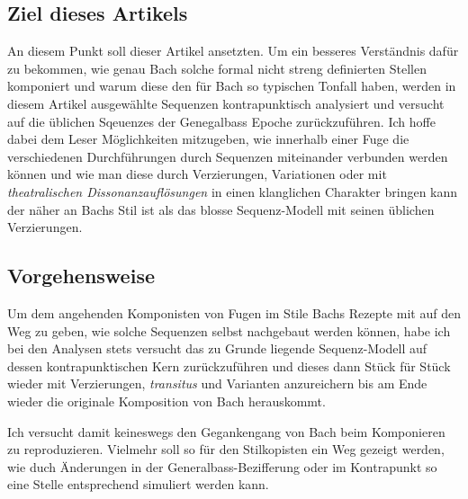 \autocite[90]{ratz:formenlehre}


\subsection{Ziel dieses Artikels}

An diesem Punkt soll dieser Artikel ansetzten.
Um ein besseres Verständnis dafür zu bekommen, wie genau Bach solche formal nicht streng definierten Stellen komponiert und warum diese den für Bach so typischen Tonfall haben, werden in diesem Artikel ausgewählte Sequenzen kontrapunktisch analysiert und versucht auf die üblichen Sqeuenzes der Genegalbass Epoche zurückzuführen.
Ich hoffe dabei dem Leser Möglichkeiten mitzugeben, wie innerhalb einer Fuge die verschiedenen Durchführungen durch Sequenzen miteinander verbunden werden können und wie man diese durch Verzierungen, Variationen oder mit \emph{theatralischen Dissonanzauflösungen}\autocite[208-219]{heinichen:general-bass,menke:kontrapunkt2} in einen klanglichen Charakter bringen kann der näher an Bachs Stil ist als das blosse Sequenz-Modell mit seinen üblichen Verzierungen.


\subsection{Vorgehensweise}

Um dem angehenden Komponisten von Fugen im Stile Bachs Rezepte mit auf den Weg zu geben, wie solche Sequenzen selbst nachgebaut werden können, habe ich bei den Analysen stets versucht das zu Grunde liegende Sequenz-Modell auf dessen kontrapunktischen Kern zurückzuführen und dieses dann Stück für Stück wieder mit Verzierungen, \emph{transitus } und Varianten anzureichern bis am Ende wieder die originale Komposition von Bach herauskommt.

Ich versucht damit keineswegs den Gegankengang von Bach beim Komponieren zu reproduzieren.
Vielmehr soll so für den Stilkopisten ein Weg gezeigt werden, wie duch Änderungen in der Generalbass-Bezifferung oder im Kontrapunkt so eine Stelle entsprechend simuliert werden kann.
